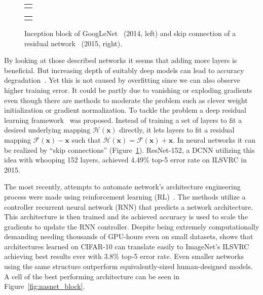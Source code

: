 \begin{figure}
	\centering
	
	\begin{tabular}{@{}c@{}}
		\subfloat{
			
		}
	\end{tabular}
	\qquad\qquad
	\begin{tabular}{@{}c@{}}
		\subfloat{
			
		}
	\end{tabular}
	
	\caption[Various advanced DCNN architectures]{Inception block of GoogLeNet~\cite{szegedy2015going} (2014, left) and skip connection of a residual network~\cite{he2016deep} (2015, right).}
	\label{fig:inception_block}
\end{figure}

By looking at those described networks it seems that adding more layers is beneficial. But increasing depth of suitably deep models can lead to accuracy degradation~\cite{he2016deep}. Yet this is not caused by overfitting since we can also observe higher training error. It could be partly due to vanishing or exploding gradients even though there are methods to moderate the problem such as clever weight initialization or gradient normalization. To tackle the problem a deep residual learning framework~\cite{he2016deep} was proposed. Instead of training a set of layers to fit a desired underlying mapping $\mathcal{H}(\bm{x})$ directly, it lets layers to fit a residual mapping $\mathcal{F}(\bm{x})-\bm{x}$ such that $\mathcal{H}(\bm{x}) = \mathcal{F}(\bm{x})+\bm{x}$. In neural networks it can be realized by ``skip connections'' (Figure~\ref{fig:inception_block}). ResNet-152, a DCNN utilizing this idea  with whooping 152 layers, achieved 4.49\% top-5 error rate on ILSVRC in 2015.

The most recently, attempts to automate network's architecture engineering process were made using reinforcement learning (RL)~\cite{zoph2016neural,zoph2017learning}. The methods utilize a controller recurrent neural network (RNN) that predicts a network architecture. This architecture is then trained and its achieved accuracy is used to scale the gradients to update the RNN controller. Despite being extremely computationally demanding needing thousands of GPU-hours even on small datasets, \cite{zoph2017learning} shows that architectures learned on CIFAR-10 can translate easily to ImageNet's ILSVRC achieving best results ever with 3.8\% top-5 error rate. Even smaller networks using the same structure outperform equivalently-sized human-designed models. A cell of the best performing architecture can be seen in Figure~\ref{fig:nasnet_block}.

